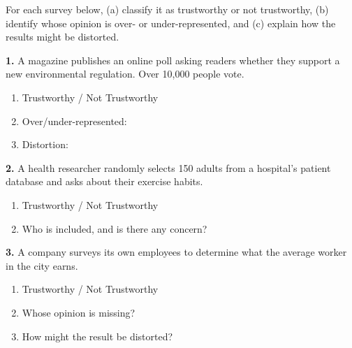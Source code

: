 \documentclass[10pt]{article}
\begin{document}
\namedateperiod

\vspace{0.1in}

\begin{practicebox}
\small
For each survey below, (a) classify it as trustworthy or not trustworthy,
(b) identify whose opinion is over- or under-represented, and
(c) explain how the results might be distorted.

\vspace{8pt}
\textbf{1.} A magazine publishes an online poll asking readers whether they support
a new environmental regulation. Over 10{,}000 people vote.

\begin{enumerate}[label=(\alph*), leftmargin=2em, itemsep=8pt]
  \item Trustworthy / Not Trustworthy \quad \writeline
  \item Over/under-represented: \writeline
  \item Distortion: \writeline\\[1pt]\writeline
\end{enumerate}

\vspace{8pt}
\textbf{2.} A health researcher randomly selects 150 adults from a hospital's patient
database and asks about their exercise habits.

\begin{enumerate}[label=(\alph*), leftmargin=2em, itemsep=8pt]
  \item Trustworthy / Not Trustworthy \quad \writeline
  \item Who is included, and is there any concern? \writeline\\[1pt]\writeline
\end{enumerate}

\vspace{8pt}
\textbf{3.} A company surveys its own employees to determine what the average worker
in the city earns.

\begin{enumerate}[label=(\alph*), leftmargin=2em, itemsep=8pt]
  \item Trustworthy / Not Trustworthy \quad \writeline
  \item Whose opinion is missing? \writeline
  \item How might the result be distorted? \writeline\\[1pt]\writeline
\end{enumerate}


\end{practicebox}
\end{document}
